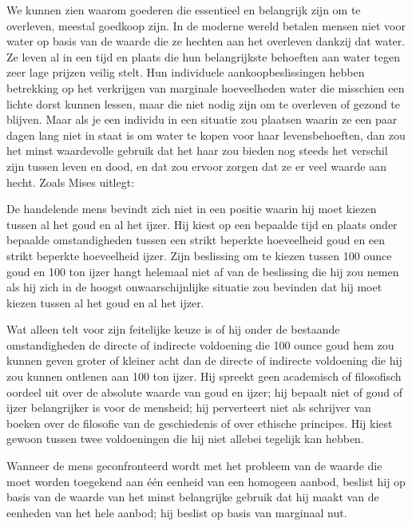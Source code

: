 We kunnen zien waarom goederen die essentieel en belangrijk zijn om te overleven, meestal goedkoop zijn. In de moderne wereld betalen mensen niet voor water op basis van de waarde die ze hechten aan het overleven dankzij dat water. Ze leven al in een tijd en plaats die hun belangrijkste behoeften aan water tegen zeer lage prijzen veilig stelt. Hun individuele aankoopbeslissingen hebben betrekking op het verkrijgen van marginale hoeveelheden water die misschien een lichte dorst kunnen lessen, maar die niet nodig zijn om te overleven of gezond te blijven. Maar als je een individu in een situatie zou plaatsen waarin ze een paar dagen lang niet in staat is om water te kopen voor haar levensbehoeften, dan zou het minst waardevolle gebruik dat het haar zou bieden nog steeds het verschil zijn tussen leven en dood, en dat zou ervoor zorgen dat ze er veel waarde aan hecht. Zoals Mises uitlegt:

\begin{blockquotebox}
    De handelende mens bevindt zich niet in een positie waarin hij moet kiezen tussen al het goud en al het ijzer. Hij kiest op een bepaalde tijd en plaats onder bepaalde omstandigheden tussen een strikt beperkte hoeveelheid goud en een strikt beperkte hoeveelheid ijzer. Zijn beslissing om te kiezen tussen 100 ounce goud en 100 ton ijzer hangt helemaal niet af van de beslissing die hij zou nemen als hij zich in de hoogst onwaarschijnlijke situatie zou bevinden dat hij moet kiezen tussen al het goud en al het ijzer.
    \par\vspace{1em}\noindent
    Wat alleen telt voor zijn feitelijke keuze is of hij onder de bestaande omstandigheden de directe of indirecte voldoening die 100 ounce goud hem zou kunnen geven groter of kleiner acht dan de directe of indirecte voldoening die hij zou kunnen ontlenen aan 100 ton ijzer. Hij spreekt geen academisch of filosofisch oordeel uit over de absolute waarde van goud en ijzer; hij bepaalt niet of goud of ijzer belangrijker is voor de mensheid; hij perverteert niet als schrijver van boeken over de filosofie van de geschiedenis of over ethische principes. Hij kiest gewoon tussen twee voldoeningen die hij niet allebei tegelijk kan hebben.
    \par\vspace{1em}\noindent
    Wanneer de mens geconfronteerd wordt met het probleem van de waarde die moet worden toegekend aan één eenheid van een homogeen aanbod, beslist hij op basis van de waarde van het minst belangrijke gebruik dat hij maakt van de eenheden van het hele aanbod; hij beslist op basis van marginaal nut.\footnotemark
\end{blockquotebox}

